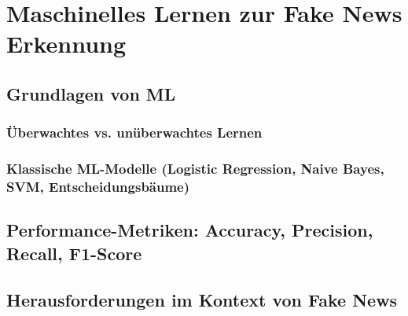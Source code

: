 \chapter{Maschinelles Lernen zur Fake News Erkennung}
\label{chap:maschinelles_lernen_zur_fake_news_erkennung}

\section{Grundlagen von ML}
\label{sec:grundlagen_ml}

\subsection{Überwachtes vs. unüberwachtes Lernen}
\label{subsec:ueberwachtes_vs_unueberwachtes_lernen}

\subsection{Klassische ML-Modelle (Logistic Regression, Naive Bayes, SVM, Entscheidungsbäume)}
\label{subsec:klassische_ml_modelle}


\section{Performance-Metriken: Accuracy, Precision, Recall, F1-Score}
\label{sec:performance_metriken}

\section{Herausforderungen im Kontext von Fake News}
\label{sec:herausforderungen_fake_news}